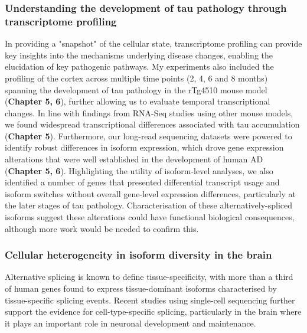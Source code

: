\subsubsection{Understanding the development of tau pathology through transcriptome profiling}
In providing a "snapshot" of the cellular state, transcriptome profiling can provide key insights into the mechanisms underlying disease changes, enabling the elucidation of key pathogenic pathways. My experiments also included the profiling of the cortex across multiple time points (2, 4, 6 and 8 months) spanning the development of tau pathology in the rTg4510 mouse model (\textbf{Chapter 5, 6}), further allowing us to evaluate temporal transcriptional changes. In line with findings from RNA-Seq studies using other mouse models, we found widespread transcriptional differences associated with tau accumulation (\textbf{Chapter 5}). Furthermore, our long-read sequencing datasets were powered to identify robust differences in isoform expression, which drove gene expression alterations that were well established in the development of human AD (\textbf{Chapter 5, 6}). Highlighting the utility of isoform-level analyses, we also identified a number of genes that presented differential transcript usage and isoform switches without overall gene-level expression differences, particularly at the later stages of tau pathology. Characterisation of these alternatively-spliced isoforms suggest these alterations could have functional biological consequences, although more work would be needed to confirm this.   

\subsubsection{Cellular heterogeneity in isoform diversity in the brain}
Alternative splicing is known to define tissue-specificity, with more than a third of human genes found to express tissue-dominant isoforms characterised by tissue-specific splicing events\cite{Wang2008,Yeo2004}. Recent studies using single-cell sequencing further support the evidence for cell-type-specific splicing, particularly in the brain where it plays an important role in neuronal development and maintenance.

